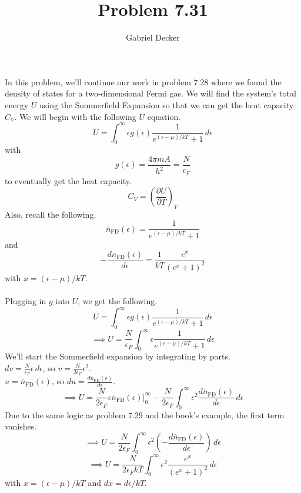 \documentclass[12pt]{article}
\title{Problem 7.31}
\author{Gabriel Decker}
\newcommand{\partDeriv}[2]{\frac{\partial #1}{\partial #2}}
\begin{document}
\maketitle
\begin{flushleft}



In this problem, we'll continue our work in problem 7.28 where we found the density of states for a two-dimensional Fermi gas.
We will find the system's total energy $U$ using the Sommerfield Expansion so that we can get the heat capacity $C_V$.
We will begin with the following $U$ equation.
\begin{equation}
    \label{eq:start}
    U=\int_0^\infty\epsilon g(\epsilon)\frac{1}{e^{(\epsilon-\mu)/kT}+1}\,d\epsilon
\end{equation}
with
\begin{equation}
    g(\epsilon)=\frac{4\pi mA}{h^2}=\frac{N}{\epsilon_F}
\end{equation}
to eventually get the heat capacity.
\begin{equation}
    C_V=\left(\partDeriv{U}{T}\right)_V
\end{equation}
Also, recall the following.
\begin{equation}
    \overline{n}_\text{FD}(\epsilon)=\frac{1}{e^{(\epsilon-\mu)/kT}+1}
\end{equation}
and
\begin{equation}
    -\frac{d\overline{n}_\text{FD}(\epsilon)}{d\epsilon}=\frac{1}{kT}\frac{e^x}{(e^x+1)^2}
\end{equation}
with $x=(\epsilon-\mu)/kT$.\\~\\

Plugging in $g$ into $U$, we get the following.
$$U=\int_0^\infty\epsilon g(\epsilon)\frac{1}{e^{(\epsilon-\mu)/kT}+1}\,d\epsilon$$
$$\implies U=\frac{N}{\epsilon_F}\int_0^\infty\epsilon\frac{1}{e^{(\epsilon-\mu)/kT}+1}\,d\epsilon$$
We'll start the Sommerfield expansion by integrating by parts.\\
$dv=\frac{N}{\epsilon_F}\epsilon\,d\epsilon$, so $v=\frac{N}{2\epsilon_F}\epsilon^2$.\\
$u=\overline{n}_\text{FD}(\epsilon)$, so $du=\frac{d\overline{n}_\text{FD}(\epsilon)}{d\epsilon}$.\\
$$\implies U=\frac{N}{2\epsilon_F}\epsilon\overline{n}_\text{FD}(\epsilon)\Big|_0^\infty-\frac{N}{2\epsilon_F}\int_0^\infty\epsilon^2\frac{d\overline{n}_\text{FD}(\epsilon)}{d\epsilon}\,d\epsilon$$
Due to the same logic as problem 7.29 and the book's example, the first term vanishes.
$$\implies U=\frac{N}{2\epsilon_F}\int_0^\infty\epsilon^2\left(-\frac{d\overline{n}_\text{FD}(\epsilon)}{d\epsilon}\right)\,d\epsilon$$
$$\implies U=\frac{N}{2\epsilon_FkT}\int_0^\infty\epsilon^2\frac{e^x}{(e^x+1)^2}\,d\epsilon$$
with $x=(\epsilon-\mu)/kT$ and $dx=d\epsilon/kT$.\\~\\


\end{flushleft}
\end{document}
